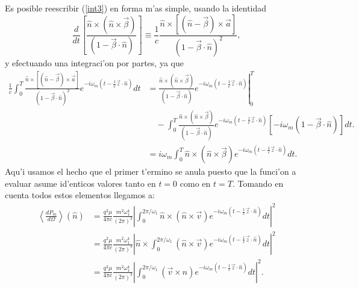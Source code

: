 Es posible reescribir (\ref{int3}) en forma m'as simple, usando la identidad
\begin{equation}
\frac{d}{dt}\left[ \frac{\hat{n}\times\left(  \hat{n}\times\vec{\beta}\right)
}{\left(  1-\vec{\beta}\cdot\hat{n}\right)  }\right] \equiv\frac{1}{c}
\frac{\hat{n}\times\left[
\left(  \hat{n}-\vec{\beta}\right)  \times\vec{a}\right]
}{\left(  1-\vec{\beta}\cdot\hat{n}\right)^2}, \label{iddt1}
\end{equation}
y efectuando una integraci'on por partes, ya que
\begin{align}
\frac{1}{c}\int_0^{T}\frac{\hat{n}\times\left[\left(\hat{n}-\vec{\beta}\right)
\times\vec{a}\right]}{\left(1-\vec{\beta}\cdot\hat{n}\right)^2} e^{-i\omega_{m}\left(t-\frac{1}{c}\vec{z}\cdot\hat{n}\right)}dt
&= \left.\frac{\hat{n}\times\left(\hat{n}\times\vec{\beta}\right)
}{\left(1-\vec{\beta}\cdot\hat{n}\right)} e^{-i\omega_{m}\left(t-\frac{1}{c}\vec{z}\cdot\hat{n}\right)  }\right|^T_0
\nonumber\\
&\quad- \int_0^{T}\frac{\hat{n}\times\left(
\hat{n}\times\vec{\beta}\right)}{\left(  1-\vec{\beta}\cdot\hat{n}\right) }
e^{-i\omega_{m}\left(t-\frac{1}{c}\vec{z}\cdot\hat{n}\right)} \left[-i\omega_m(1-\vec{\beta}\cdot\hat{n})\right] dt. \\
&=i\omega_m \int_0^{T}\hat{n}\times\left(\hat{n}\times\vec{\beta}\right)
e^{-i\omega_{m}\left(t-\frac{1}{c}\vec{z}\cdot\hat{n}\right)  }dt.
\end{align}
Aqu'i usamos el hecho que el primer t'ermino se anula puesto que la funci'on a evaluar asume
id'enticos valores tanto en $t=0$ como en $t=T$. Tomando en cuenta todos estos
elementos llegamos a:
\begin{align}
\left\langle \frac{dP_{m}}{d\Omega}\right\rangle (\hat{n}) &
=\frac{q^2\mu}{4\pi c}\frac{m^2\omega_1^4}{\left(2\pi\right)^3}\left|\int_0^{2\pi/\omega_1}\hat{n}\times\left(\hat{n}\times\vec{v}\right)
e^{-i\omega_{m}\left(t-\frac{1}{c}\vec{z}\cdot\hat{n}\right)}dt \right|^2\\
&=\frac{q^2\mu}{4\pi c}\frac{m^2\omega_1^4}{\left(2\pi\right)^3}\left|
\hat{n}\times\int_0^{2\pi/\omega_1}\left(  \hat{n}\times\vec{v}\right)
e^{-i\omega_{m}\left(t-\frac{1}{c}\vec{z}\cdot\hat{n}\right)  }dt \right|^2\\
&=\frac{q^2\mu}{4\pi c}\frac{m^2\omega_1^4}{\left(2\pi\right)^3}\left|
\int_0^{2\pi/\omega_1}\left(  \vec{v}\times\hat{n}\right)  e^{-i\omega
_{m}\left(t-\frac{1}{c}\vec{z}\cdot\hat{n}\right) }dt \right|^2.
\end{align}

